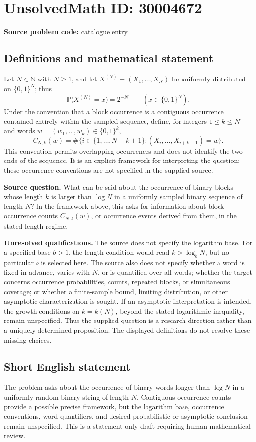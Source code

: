 \documentclass[11pt]{article}
\newcommand{\N}{\mathbb{N}}
\begin{document}
\section*{UnsolvedMath ID: 30004672}
\textbf{Source problem code:} catalogue entry
\subsection{Definitions and mathematical statement}
Let \(N\in\N\) with \(N\geq 1\), and let \(X^{(N)}=(X_1,\ldots,X_N)\) be uniformly distributed on \(\{0,1\}^N\); thus
\[
\mathbb P\bigl(X^{(N)}=x\bigr)=2^{-N}\qquad(x\in\{0,1\}^N).
\]
Under the convention that a block occurrence is a contiguous occurrence contained entirely within the sampled sequence, define, for integers \(1\leq k\leq N\) and words \(w=(w_1,\ldots,w_k)\in\{0,1\}^k\),
\[
C_{N,k}(w)=\#\bigl\{i\in\{1,\ldots,N-k+1\}:(X_i,\ldots,X_{i+k-1})=w\bigr\}.
\]
This convention permits overlapping occurrences and does not identify the two ends of the sequence. It is an explicit framework for interpreting the question; these occurrence conventions are not specified in the supplied source.

\textbf{Source question.} What can be said about the occurrence of binary blocks whose length \(k\) is larger than \(\log N\) in a uniformly sampled binary sequence of length \(N\)? In the framework above, this asks for information about block occurrence counts \(C_{N,k}(w)\), or occurrence events derived from them, in the stated length regime.

\textbf{Unresolved qualifications.} The source does not specify the logarithm base. For a specified base \(b>1\), the length condition would read \(k>\log_b N\), but no particular \(b\) is selected here. The source also does not specify whether a word is fixed in advance, varies with \(N\), or is quantified over all words; whether the target concerns occurrence probabilities, counts, repeated blocks, or simultaneous coverage; or whether a finite-sample bound, limiting distribution, or other asymptotic characterization is sought. If an asymptotic interpretation is intended, the growth conditions on \(k=k(N)\), beyond the stated logarithmic inequality, remain unspecified. Thus the supplied question is a research direction rather than a uniquely determined proposition. The displayed definitions do not resolve these missing choices.
\subsection{Short English statement}
The problem asks about the occurrence of binary words longer than \(\log N\) in a uniformly random binary string of length \(N\). Contiguous occurrence counts provide a possible precise framework, but the logarithm base, occurrence conventions, word quantifiers, and desired probabilistic or asymptotic conclusion remain unspecified. This is a statement-only draft requiring human mathematical review.
\end{document}
